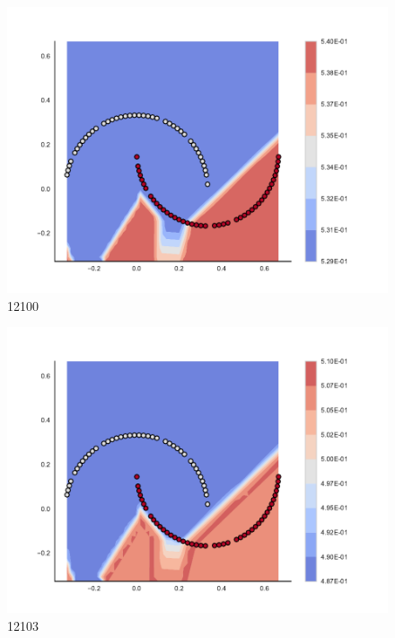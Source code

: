\begin{subfigure}[b]{0.09\textwidth}
    \includegraphics[clip, trim=2.35cm 1.75cm 4.5cm 0cm,width=\textwidth]{img/convergence/12100.pdf}
    \caption{12100}
    \label{fig:convergence_12100}
\end{subfigure}
%
\begin{subfigure}[b]{0.09\textwidth}
    \includegraphics[clip, trim=2.35cm 1.75cm 4.5cm 0cm,width=\textwidth]{img/convergence/12103.pdf}
    \caption{12103}
    \label{fig:convergence_12103}
\end{subfigure}
%
